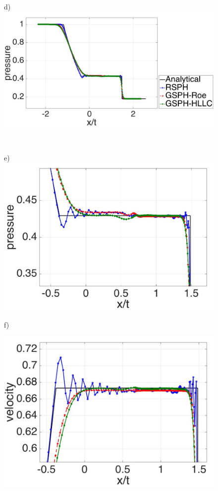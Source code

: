 \documentclass[preprint,12pt,authoryear]{elsarticle}
\begin{document}
\begin{figure}[H]
\begin{minipage}{.45\textwidth}
    \end{minipage}%
    \begin{minipage}{.545 \textwidth}
        \centering d)
        \includegraphics[width=0.99 \textwidth,height=0.4954\textwidth]{./Figures/RCM-Sod-GSPH-compare-p}
    \end{minipage}%
    \\
    \begin{minipage}{.45\textwidth}
        \centering e)
        \includegraphics[width= 0.99 \textwidth, height=0.625 \textwidth]{./Figures/RCM-Sod-GSPH-compare-p-zoom}    
    \end{minipage}%
    \begin{minipage}{.545\textwidth}
        \centering f)
        \begin{flushleft}
        \includegraphics[width= 0.8174 \textwidth, height=0.4954 \textwidth]{./Figures/RCM-Sod-GSPH-compare-v-zoom}    

\end{flushleft}
\end{minipage}
\end{figure}
\end{document}

